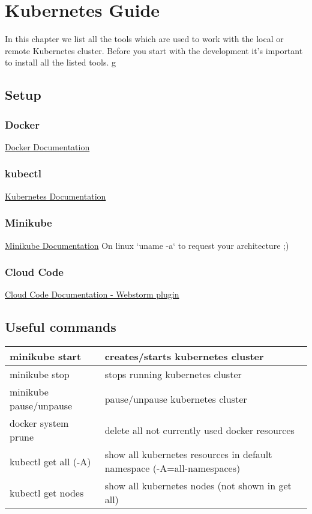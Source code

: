 \chapter{Kubernetes Guide}
\label{chap: kubernetes-guide}

In this chapter we list all the tools which are used to work with the local or remote Kubernetes cluster. Before you start with the development it's important to install all the listed tools.
g
\section{Setup}
\subsection{Docker}
\href{https://docs.docker.com/get-docker/}{Docker Documentation}

\subsection{kubectl}
\href{https://kubernetes.io/docs/tasks/tools/#kubectl}{Kubernetes Documentation}

\subsection{Minikube}
\href{https://minikube.sigs.k8s.io/docs/start/}{Minikube Documentation} \newline
On linux `uname -a` to request your architecture ;)

\subsection{Cloud Code}
\href{https://plugins.jetbrains.com/plugin/8079-cloud-code/}{Cloud Code Documentation - Webstorm plugin}

\section{Useful commands}
\begin{tabular}{|l | l|}
    \hline
    minikube start & creates/starts kubernetes cluster \\
    \hline
    minikube stop & stops running kubernetes cluster \\
    \hline
    minikube pause/unpause & pause/unpause kubernetes cluster \\
    \hline
    docker system prune & delete all not currently used docker resources \\
    \hline
    kubectl get all (-A) & show all kubernetes resources in default namespace (-A=all-namespaces) \\
    \hline
    kubectl get nodes & show all kubernetes nodes (not shown in get all) \\
    \hline

\end{tabular}
 
